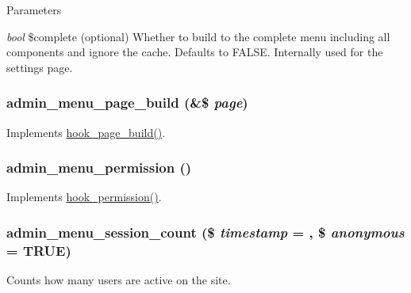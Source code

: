 \begin{DoxyParams}{Parameters}
\item[{\em bool}]\$complete (optional) Whether to build to the complete menu including all components and ignore the cache. Defaults to FALSE. Internally used for the settings page. \end{DoxyParams}
\hypertarget{admin__menu_8module_a8677d20e73452e73b868bf871abf57a1}{
\subsubsection[{admin\_\-menu\_\-page\_\-build}]{\setlength{\rightskip}{0pt plus 5cm}admin\_\-menu\_\-page\_\-build (\&\$ {\em page})}}
\label{admin__menu_8module_a8677d20e73452e73b868bf871abf57a1}
Implements \hyperlink{group__hooks_ga16d8d8ae818dc759bbe539e16ff5b93b}{hook\_\-page\_\-build()}. \hypertarget{admin__menu_8module_a3426d8ce72ca5c37740a6e7a1aa269c1}{
\subsubsection[{admin\_\-menu\_\-permission}]{\setlength{\rightskip}{0pt plus 5cm}admin\_\-menu\_\-permission ()}}
\label{admin__menu_8module_a3426d8ce72ca5c37740a6e7a1aa269c1}
Implements \hyperlink{group__hooks_ga2b22b45f4925f2478412477bae329713}{hook\_\-permission()}. \hypertarget{admin__menu_8module_a6fe5151c8d300535152c76edffcf6f5d}{
\subsubsection[{admin\_\-menu\_\-session\_\-count}]{\setlength{\rightskip}{0pt plus 5cm}admin\_\-menu\_\-session\_\-count (\$ {\em timestamp} = {}, \/  \$ {\em anonymous} = {\ttfamily TRUE})}}
\label{admin__menu_8module_a6fe5151c8d300535152c76edffcf6f5d}
Counts how many users are active on the site.

